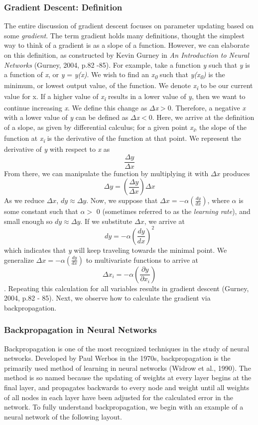 \documentclass[11pt]{article}
\begin{document}
\subsubsection{Gradient Descent: Definition}
The entire discussion of gradient descent focuses on parameter updating based on some \textit{gradient}. The term gradient holds many definitions, thought the simplest way to think of a gradient is as a slope of a function. However, we can elaborate on this definition, as constructed by Kevin Gurney in \textit{An Introduction to Neural Networks} (Gurney, 2004, p.82 -85). For example, take a function \textit{y} such that \textit{y} is a function of \textit{x}, or \textit{y} = \textit{y(x)}. We wish to find an \textit{x\textsubscript{0}} such that \textit{y(x\textsubscript{0})} is the minimum, or lowest output value, of the function. We denote \textit{x\textsubscript{i}} to be our current value for x. If a higher value of \textit{x\textsubscript{i}} results in a lower value of \textit{y}, then we want to continue increasing \textit{x}. We define this change as $\Delta$\textit{x}$>$0. Therefore, a negative \textit{x} with a lower value of \textit{y} can be defined as $\Delta$\textit{x}$<$0. Here, we arrive at the definition of a slope, as given by differential calculus; for a given point \textit{x\textsubscript{i}}, the slope of the function at \textit{x\textsubscript{i}} is the derivative of the function at that point. We represent the derivative of \textit{y} with respect to \textit{x} as $$\frac{\Delta y}{\Delta x}$$ From there, we can manipulate the function by multiplying it with $\Delta x$ produces $$\Delta y = (\frac{\Delta y}{\Delta x})\Delta x$$ As we reduce $\Delta x$, $dy \approx \Delta y$. Now, we suppose that $\Delta x = -\alpha(\frac{dy}{dx}) $, where $\alpha$ is some constant such that $\alpha > $ 0 (sometimes referred to as the \textit{learning rate}), and small enough so $dy \approx \Delta y$. If we substitute $\Delta x$, we arrive at $$ dy = -\alpha(\frac{dy}{dx})^{2}$$ which indicates that \textit{y} will keep traveling towards the minimal point. We generalize $\Delta x = -\alpha(\frac{dy}{dx}) $ to multivariate functions to arrive at $$\Delta x_i = -\alpha(\frac{\partial y}{\partial x_i})$$. Repeating this calculation for all variables results in gradient descent (Gurney, 2004, p.82 - 85). Next, we observe how to calculate the gradient via backpropagation.

\subsubsection{Backpropagation in Neural Networks}
Backpropagation is one of the most recognized techniques in the study of neural networks. Developed by Paul Werbos in the 1970s, backpropagation is the primarily used method of learning in neural networks (Widrow et al., 1990). The method is so named because the updating of weights at every layer begins at the final layer, and propagates backwards to every node and weight until all weights of all nodes in each layer have been adjusted for the calculated error in the network. To fully understand backpropagation, we begin with an example of a neural network of the following layout.
\end{document}
